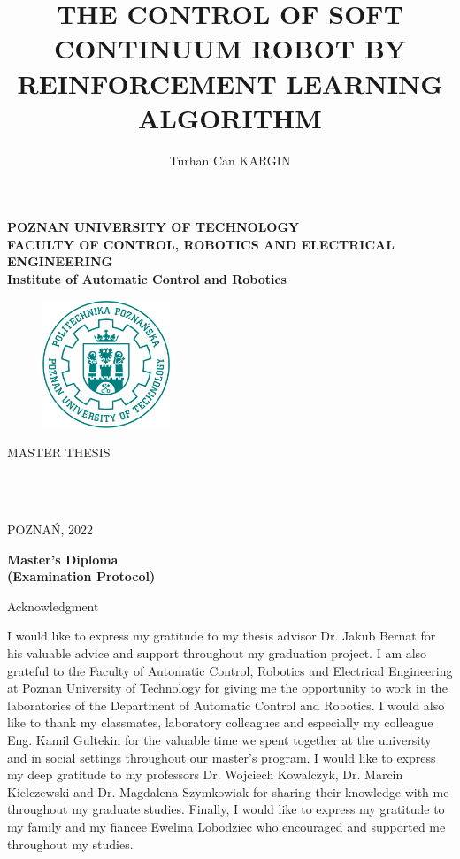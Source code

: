 \documentclass[12pt,twoside,a4]{mwbk}
\author{Turhan Can KARGIN}
\title{{\Large \bf THE CONTROL OF SOFT CONTINUUM ROBOT BY REINFORCEMENT LEARNING ALGORITHM}}
\makeatletter
\renewcommand{\maketitle}{
\begin{titlepage}
  \begin{center}
    {\Large \bf POZNAN UNIVERSITY OF TECHNOLOGY}\\
    \vspace{0.15in}
    {\large \bf FACULTY OF CONTROL, ROBOTICS AND ELECTRICAL ENGINEERING}\\
    \vspace{0.15in}
    {\large \bf Institute of Automatic Control and Robotics}\\
    \vspace{0.3in}
    
    \begin{figure}[h]
    \centering
    \includegraphics[height=1.5in]{logoPP.jpg}
    \end{figure}

    \vspace{0.7in}
    {\large MASTER THESIS}\\
    \vspace{0.15in}
    \textsc{\@title}
  \end{center}

 \begin{center}
   \vspace{0.8in}
   {\LARGE \centering \@author} \par
 \end{center}

 \begin{flushleft}
    \vspace{1.2in}
     \hspace{4in}{Supervisor:}\\
     \hspace{4in}{dr hab. in\. z. Jakub Bernat}\\
  \end{flushleft}
    \vspace*{\stretch{1}}
    \begin{center}
    POZNA\' N, 2022
    \end{center}
\end{titlepage}}
\makeatother
\begin{document}
\pagestyle{empty}
\maketitle
\newpage
\thispagestyle{empty}
    \vspace*{1cm}
   \begin{center} 
   {\Large \bf Master's Diploma \\
   (Examination Protocol)}
   \end{center}
\newpage
{}
\hspace{5cm}
\begin{minipage}{10cm}
{\Large Acknowledgment}
\vspace{7mm}

I would like to express my gratitude to my thesis advisor Dr. Jakub Bernat for his valuable advice and support throughout my graduation project. I am also grateful to the Faculty of Automatic Control, Robotics and Electrical Engineering at Poznan University of Technology for giving me the opportunity to work in the laboratories of the Department of Automatic Control and Robotics. I would also like to thank my classmates, laboratory colleagues and especially my colleague Eng. Kamil Gultekin for the valuable time we spent together at the university and in social settings throughout our master's program. I would like to express my deep gratitude to my professors Dr. Wojciech Kowalczyk, Dr. Marcin Kielczewski and Dr. Magdalena Szymkowiak for sharing their knowledge with me throughout my graduate studies. Finally, I would like to express my gratitude to my family and my fiancee Ewelina Lobodziec who encouraged and supported me throughout my studies.

%
%
%
%
%
\end{minipage}
\end{document}

